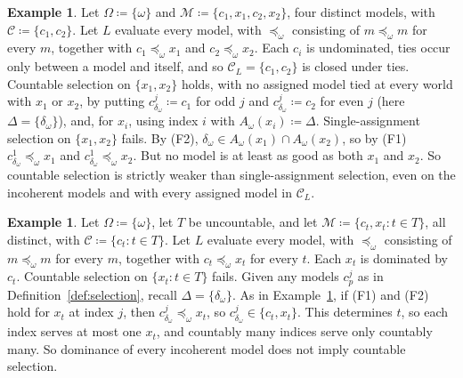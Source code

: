 \documentclass[11pt]{article}
\theoremstyle{definition}
\newtheorem{example}[theorem]{Example}
\theoremstyle{remark}
\newcommand{\M}{\mathcal M}
\newcommand{\C}{\mathcal C}
\begin{document}
\begin{example}\label{ex:two-pairs}
Let $\Omega\coloneqq\{\omega\}$ and $\M\coloneqq\{c_1,x_1,c_2,x_2\}$, four distinct models, with $\C\coloneqq\{c_1,c_2\}$. Let $L$ evaluate every model, with $\preceq_\omega$ consisting of $m\preceq_\omega m$ for every $m$, together with $c_1\preceq_\omega x_1$ and $c_2\preceq_\omega x_2$. Each $c_i$ is undominated, ties occur only between a model and itself, and so $\C_L=\{c_1,c_2\}$ is closed under ties. {\color{red}Countable selection on $\{x_1,x_2\}$ holds, with no assigned model tied at every world with $x_1$ or $x_2$, by} {\color{red}putting $c^j_{\delta_\omega}\coloneqq c_1$ for odd $j$ and $c^j_{\delta_\omega}\coloneqq c_2$ for even $j$ (here $\Delta=\{\delta_\omega\}$), and, for $x_i$, using index $i$ with $A_\omega(x_i)\coloneqq\Delta$. Single-assignment selection on $\{x_1,x_2\}$ fails. By (F2), $\delta_\omega\in A_\omega(x_1)\cap A_\omega(x_2)$, so by (F1) $c^1_{\delta_\omega}\preceq_\omega x_1$ and $c^1_{\delta_\omega}\preceq_\omega x_2$.} But no model is at least as good as both $x_1$ and $x_2$. So countable selection is strictly weaker than single-assignment selection, even on the incoherent models and with every assigned model in $\C_L$.
\end{example}

\begin{example}\label{ex:uncountable}
Let $\Omega\coloneqq\{\omega\}$, let $T$ be uncountable, and let $\M\coloneqq\{c_t,x_t:t\in T\}$, all distinct, with $\C\coloneqq\{c_t:t\in T\}$. Let $L$ evaluate every model, with $\preceq_\omega$ consisting of $m\preceq_\omega m$ for every $m$, together with $c_t\preceq_\omega x_t$ for every $t$. Each $x_t$ is dominated by $c_t$. Countable selection on $\{x_t:t\in T\}$ fails. {\color{red}Given any models $c^j_p$ as in Definition~\ref{def:selection}, recall $\Delta=\{\delta_\omega\}$. As in Example~\ref{ex:two-pairs}, if (F1) and (F2) hold for $x_t$ at index $j$, then $c^j_{\delta_\omega}\preceq_\omega x_t$, so $c^j_{\delta_\omega}\in\{c_t,x_t\}$.} This determines $t$, so each index serves at most one $x_t$, and countably many indices serve only countably many. So dominance of every incoherent model does not imply countable selection.
\end{example}
\end{document}
